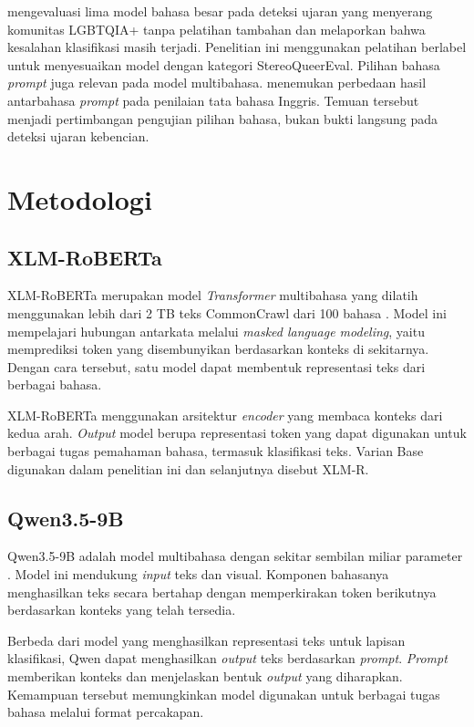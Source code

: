 \documentclass[11pt]{article}
\begin{document}
\citet{nguyen-etal-2025-leveraging} mengevaluasi lima model bahasa besar pada deteksi ujaran yang menyerang komunitas LGBTQIA+ tanpa pelatihan tambahan dan melaporkan bahwa kesalahan klasifikasi masih terjadi. Penelitian ini menggunakan pelatihan berlabel untuk menyesuaikan model dengan kategori StereoQueerEval. Pilihan bahasa \textit{prompt} juga relevan pada model multibahasa. \citet{behzad-etal-2024-ask} menemukan perbedaan hasil antarbahasa \textit{prompt} pada penilaian tata bahasa Inggris. Temuan tersebut menjadi pertimbangan pengujian pilihan bahasa, bukan bukti langsung pada deteksi ujaran kebencian.

\section{Metodologi}
\subsection{XLM-RoBERTa}
XLM-RoBERTa merupakan model \textit{Transformer} multibahasa yang dilatih menggunakan lebih dari 2 TB teks CommonCrawl dari 100 bahasa \citep{conneau-etal-2020-unsupervised}. Model ini mempelajari hubungan antarkata melalui \textit{masked language modeling}, yaitu memprediksi token yang disembunyikan berdasarkan konteks di sekitarnya. Dengan cara tersebut, satu model dapat membentuk representasi teks dari berbagai bahasa.

XLM-RoBERTa menggunakan arsitektur \textit{encoder} yang membaca konteks dari kedua arah. \textit{Output} model berupa representasi token yang dapat digunakan untuk berbagai tugas pemahaman bahasa, termasuk klasifikasi teks. Varian Base digunakan dalam penelitian ini dan selanjutnya disebut XLM-R.

\subsection{Qwen3.5-9B}
Qwen3.5-9B adalah model multibahasa dengan sekitar sembilan miliar parameter \citep{qwen-team-2026-qwen35}. Model ini mendukung \textit{input} teks dan visual. Komponen bahasanya menghasilkan teks secara bertahap dengan memperkirakan token berikutnya berdasarkan konteks yang telah tersedia.

Berbeda dari model yang menghasilkan representasi teks untuk lapisan klasifikasi, Qwen dapat menghasilkan \textit{output} teks berdasarkan \textit{prompt}. \textit{Prompt} memberikan konteks dan menjelaskan bentuk \textit{output} yang diharapkan. Kemampuan tersebut memungkinkan model digunakan untuk berbagai tugas bahasa melalui format percakapan.
\end{document}
